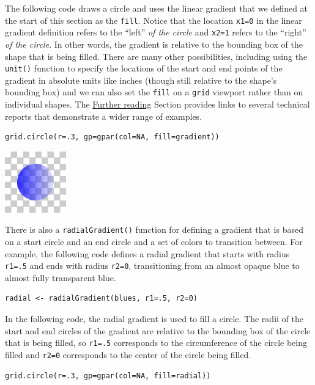 The following code draws a circle and uses the linear gradient that we
defined at the start of this section as the \texttt{fill}.
Notice that the location \texttt{x1=0} in the linear gradient definition
refers to the ``left'' \emph{of the circle} and
\texttt{x2=1} refers to the ``right'' \emph{of the circle}. In other
words, the gradient is relative to the bounding box of the shape
that is being filled. There are many other possibilities, including
using the \texttt{unit()} function to specify the locations of the start
and end points of the gradient in absolute units like inches
(though still relative to the shape's bounding box) and we can also set
the \texttt{fill} on a \texttt{grid} viewport rather than on individual shapes.
The \protect\hyperlink{further-reading}{Further reading} Section provides links
to several technical reports that demonstrate a wider range of
examples.

\begin{verbatim}
grid.circle(r=.3, gp=gpar(col=NA, fill=gradient))
\end{verbatim}

\includegraphics{murrell-definitions-2023_files/figure-latex/unnamed-chunk-4-1.png}

There is also a \texttt{radialGradient()} function for defining a gradient
that is based on a start circle and an end circle and a set of colors
to transition between. For example, the following code
defines a radial gradient that starts with radius \texttt{r1=.5} and ends with
radius \texttt{r2=0}, transitioning from an almost opaque blue
to almost
fully transparent blue.

\begin{verbatim}
radial <- radialGradient(blues, r1=.5, r2=0)
\end{verbatim}

In the following code, the radial gradient is used to fill a circle.
The radii of the start and end circles of the gradient
are relative to the bounding box of the circle that is being filled,
so \texttt{r1=.5} corresponds to the circumference of the circle being filled
and \texttt{r2=0} corresponds to the center of the circle being filled.

\begin{verbatim}
grid.circle(r=.3, gp=gpar(col=NA, fill=radial))
\end{verbatim}


